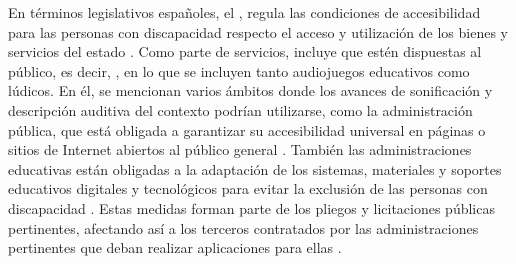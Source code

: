  En términos legislativos españoles, el , regula  las condiciones de accesibilidad para las personas con discapacidad respecto el acceso y utilización de los bienes y servicios del estado \cite{ministeriodederechossocialesyagenda2030RealDecreto1932023}. Como parte de servicios, incluye  que estén dispuestas al público, es decir, \cite[p ~6]{ministeriodederechossocialesyagenda2030RealDecreto1932023}, en lo que se incluyen tanto audiojuegos educativos como lúdicos. En él, se mencionan varios ámbitos donde los avances de sonificación y descripción auditiva del contexto podrían utilizarse, como la administración pública, que está obligada a garantizar su accesibilidad universal en páginas o sitios de Internet abiertos al público general \cite[p ~10]{ministeriodesanidadserviciossocialeseigualdadRealDecretoLegislativo2013}. También las administraciones educativas están obligadas a la adaptación de los sistemas, materiales y soportes educativos digitales y tecnológicos para evitar la exclusión de las personas con discapacidad \cite[p ~13]{ministeriodederechossocialesyagenda2030RealDecreto1932023}. Estas medidas forman parte de los pliegos y licitaciones públicas pertinentes, afectando así a los terceros contratados por las administraciones pertinentes que deban realizar aplicaciones para ellas \cite[p ~17]{ministeriodederechossocialesyagenda2030RealDecreto1932023}.\\
 
